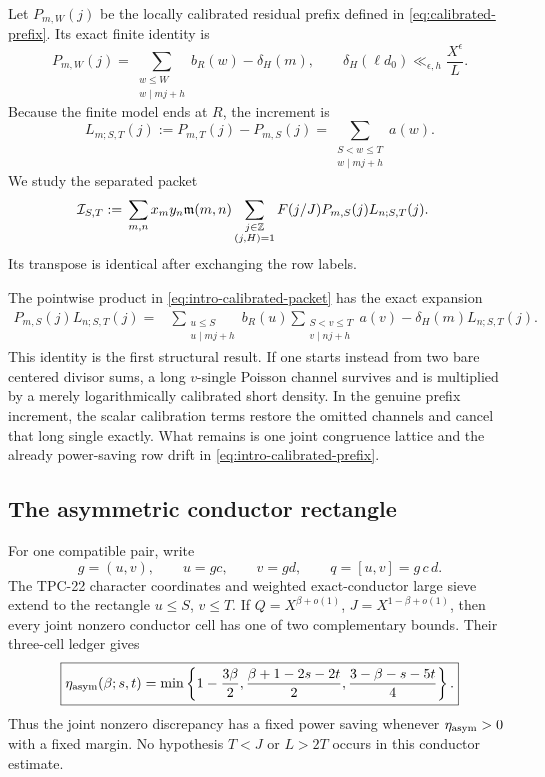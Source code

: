 Let \(P_{m,W}(j)\) be the locally calibrated residual prefix defined in
\cref{eq:calibrated-prefix}.  Its exact finite identity is
\begin{equation}
 P_{m,W}(j)
 =\sum_{\substack{w\le W\\w\mid mj+h}}b_R(w)-\delta_H(m),
 \qquad
 \delta_H(\ell d_0)\ll_{\epsilon,h}\frac{X^\epsilon}{L}.
 \label{eq:intro-calibrated-prefix}
\end{equation}
Because the finite model ends at \(R\), the increment is
\begin{equation}
 L_{m;S,T}(j):=P_{m,T}(j)-P_{m,S}(j)
 =\sum_{\substack{S<w\le T\\w\mid mj+h}}a(w).
 \label{eq:intro-exact-increment}
\end{equation}
We study the separated packet
\begin{align}
 \mathcal I_{S,T}:={}&
 \sum_{m,n}x_my_n\mathfrak m(m,n)
 \sum_{\substack{j\in\mathbb Z\\(j,H)=1}}F(j/J)
 P_{m,S}(j)L_{n;S,T}(j).
 \label{eq:intro-calibrated-packet}
\end{align}
Its transpose is identical after exchanging the row labels.

The pointwise product in \eqref{eq:intro-calibrated-packet} has the
exact expansion
\begin{align}
 P_{m,S}(j)L_{n;S,T}(j)
 ={}&
 \sum_{\substack{u\le S\\u\mid mj+h}}b_R(u)
 \sum_{\substack{S<v\le T\\v\mid nj+h}}a(v)
 -\delta_H(m)L_{n;S,T}(j).
 \label{eq:intro-joint-minus-drift}
\end{align}
This identity is the first structural result.  If one starts instead
from two bare centered divisor sums, a long \(v\)-single Poisson
channel survives and is multiplied by a merely logarithmically
calibrated short density.  In the genuine prefix increment, the scalar
calibration terms restore the omitted channels and cancel that long
single exactly.  What remains is one joint congruence lattice and the
already power-saving row drift in \eqref{eq:intro-calibrated-prefix}.

\subsection{The asymmetric conductor rectangle}

For one compatible pair, write
\[
 g=(u,v),\qquad u=gc,\qquad v=gd,\qquad q=[u,v]=g\,c\,d.
\]
The TPC-22 character coordinates and weighted exact-conductor large
sieve extend to the rectangle \(u\le S\), \(v\le T\).  If
\(Q=X^{\beta+o(1)}\), \(J=X^{1-\beta+o(1)}\), then every joint
nonzero conductor cell has one of two complementary bounds.  Their
three-cell ledger gives
\begin{equation}
 \boxed{
 \eta_{\rm asym}(\beta;s,t)=
 \min\left\{
 1-\frac{3\beta}{2},
 \frac{\beta+1-2s-2t}{2},
 \frac{3-\beta-s-5t}{4}
 \right\}.}
 \label{eq:intro-asym-saving}
\end{equation}
Thus the joint nonzero discrepancy has a fixed power saving whenever
\(\eta_{\rm asym}>0\) with a fixed margin.  No hypothesis \(T<J\) or
\(L>2T\) occurs in this conductor estimate.

